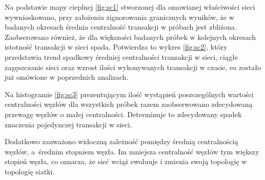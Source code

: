 \documentclass[12pt, twoside, final, openany]{mgr}
\begin{document}
\indent Na podstawie mapy cieplnej \ref{fig:sc1} stworzonej dla omawianej właściwości sieci wywnioskowano, przy założeniu zignorowania granicznych wyników, że w badanych okresach średnia centralność transakcji w próbach jest zbliżona. Zaobserowano również, że dla większości badanych próbek w kolejnych okresach istotność transakcji w sieci spada. Potwierdza to wykres \ref{fig:sc2}, który przedstawia trend spadkowy średniej centralności transakcji w sieci, ciągłe zagęszczanie sieci oraz wzrost ilości wykonywanych transakcji w czasie, co zostało już omówione w poprzednich analizach.

\indent Na histogramie \ref{fig:sc3} prezentującym ilość wystąpień poszczególnych wartości centralności węzłów dla wszystkich próbek razem zaobserwowano zdecydowaną przewagę węzłów o małej centralności. Determinuje to zdecydowany spadek znaczenia pojedynczej transakcji w sieci.

\indent Dodatkowo zauważono widoczną zależność pomiędzy średnią centralnością węzłów, a~średnim stopniem węzła. Im mniejsza centralność węzłów tym większy stopień węzła, co oznacza, że sieć wciąż ewoluuje i zmienia swoją topologię w topologię siatki. 
\end{document}

